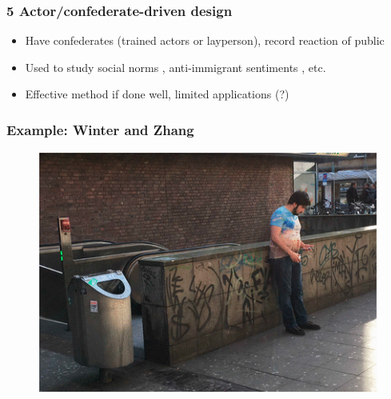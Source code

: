 \documentclass[12pt,english,dvipsnames,aspectratio=169,handout]{beamer}\usepackage[]{graphicx}\usepackage[]{xcolor}
\begin{document}
\begin{frame}
	\frametitle{5 Actor/confederate-driven design}
	\footnotesize
\begin{itemize}
  \item Have confederates (trained actors or layperson), record reaction of public
  \item Used to study social norms \cite{cohen_field_1997, winter_social_2018}, anti-immigrant sentiments \cite{enos_causal_2014}, etc.
  \item Effective method if done well, limited applications (?)
\end{itemize}
\vspace{3cm}
\end{frame}


\begin{frame}
	\frametitle{Example: Winter and Zhang \citeyear{winter_social_2018}}
    \begin{figure}[ht]
        \begin{minipage}[b]{0.6\linewidth}
            \centering
            \includegraphics[width=\textwidth]{../04-figures/12/17-w12_actor}
        \end{minipage}
        \hspace{0.5cm}
        \begin{minipage}[b]{0.25\linewidth}
            \centering

\end{minipage}
\end{figure}
\end{frame}
\end{document}
